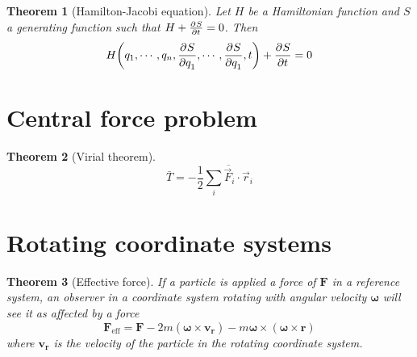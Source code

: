\documentclass[]{article}
\newtheorem{theorem}{Theorem}
\theoremstyle{definition}
\begin{document}
\begin{theorem}[Hamilton-Jacobi equation]
	Let $H$ be a Hamiltonian function and $S$ a generating function such that $H + \frac{\partial^{} S}{\partial t ^{}} = 0$. Then
	\begin{equation*}
		H\qty(q_1, \cdots, q_n, \frac{\partial^{} S}{\partial q_1 ^{}}, \cdots, \frac{\partial^{} S}{\partial q_1 ^{}}, t) + \frac{\partial^{} S}{\partial t ^{}} = 0
	\end{equation*}
\end{theorem}

\section{Central force problem}
\begin{theorem}[Virial theorem]
	\begin{equation*}
		\bar T = -\frac{1}{2} \overline{\sum_i\vec F_i \cdot \vec r_i}
	\end{equation*}
\end{theorem}

\section{Rotating coordinate systems}
\begin{theorem}[Effective force]
	If a particle is applied a force of $\mathbf{F}$ in a reference system, an observer in a coordinate system rotating with angular velocity $\bm \omega$ will see it as affected by a force
\begin{equation*}
	\mathbf{F}_\text{eff} = \mathbf{F} - 2m(\bm{\omega} \times \mathbf{v_r}) - m \bm{\omega} \times(\bm{\omega} \times \mathbf{r})
\end{equation*}
where $\mathbf{v_r}$ is the velocity of the particle in the rotating coordinate system.
\end{theorem}
\end{document}
